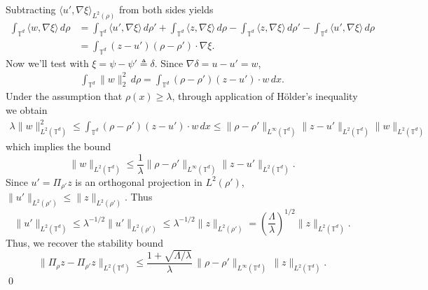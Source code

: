 \documentclass[11pt]{article}
\begin{document}
Subtracting $\langle u', \nabla \xi \rangle_{L^2(\rho)}$ from both sides yields
\begin{align*}
    \int_{\mathbb{T}^d} \langle w, \nabla \xi\rangle\, d\rho &= \int_{\mathbb{T}^d} \langle u', \nabla \xi\rangle\, d\rho'+\int_{\mathbb{T}^d} \langle z, \nabla\xi \rangle \, d\rho - \int_{\mathbb{T}^d} \langle z, \nabla\xi \rangle \, d\rho' - \int_{\mathbb{T}^d} \langle u', \nabla \xi\rangle\, d\rho \\
    &=\int_{\mathbb{T}^d} (z - u')(\rho - \rho') \cdot \nabla \xi.
\end{align*}
Now we'll test with $\xi = \psi - \psi' \triangleq \delta$. Since $\nabla \delta = u - u' = w$,
\begin{align*}
    \int_{\mathbb{T}^d}  \|w\|_2^2 \,d\rho = \int_{\mathbb{T}^d}(\rho - \rho')(z-u') \cdot w \, dx.
\end{align*}
Under the assumption that $\rho(x) \geq \lambda$, through application of H\"older's inequality we obtain
\begin{align*}
    \lambda \|w\|_{L^2(\mathbb{T}^d)}^2 \leq \int_{\mathbb{T}^d}(\rho - \rho')(z-u') \cdot w \, dx \leq \|\rho - \rho'\|_{L^\infty(\mathbb{T}^d)}\|z-u'\|_{L^2(\mathbb{T}^d)}\|w\|_{L^2(\mathbb{T}^d)}
\end{align*}
which implies the bound 
\[\|w\|_{L^2(\mathbb{T}^d)} \leq \frac{1}{\lambda}\|\rho - \rho'\|_{L^\infty(\mathbb{T}^d)}\|z-u'\|_{L^2(\mathbb{T}^d)}.\]
Since $u' = \Pi_{\rho'}z$ is an orthogonal projection in $L^2(\rho')$, $\|u'\|_{L^2(\rho')} \leq \|z\|_{L^2(\rho')}.$ Thus
\[\|u'\|_{L^2(\mathbb{T}^d)} \leq \lambda^{-1/2}\|u'\|_{L^2(\rho')} \leq \lambda^{-1/2}\|z\|_{L^2(\rho')} = \left(\frac{\Lambda}{\lambda}\right)^{1/2}\|z\|_{L^2(\mathbb{T}^d)}.\]
Thus, we recover the stability bound
\[\|\Pi_\rho z-\Pi_{\rho'} z\|_{L^2(\mathbb{T}^d)}
    \le
    \frac{1 + \sqrt{\Lambda/\lambda}}{\lambda}\,\|\rho-\rho'\|_{L^\infty(\mathbb{T}^d)}\,\|z\|_{L^2(\mathbb{T}^d)}.\]
\qed{}
\end{document}
